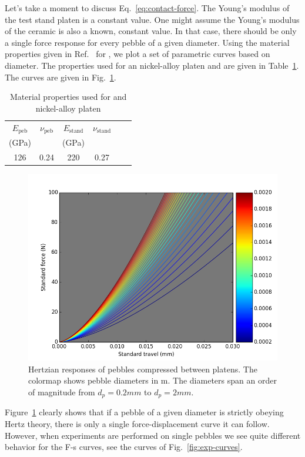 Let's take a moment to discuss Eq.~\ref{eq:contact-force}. The Young's modulus of the test stand platen is a constant value. One might assume the Young's modulus of the ceramic is also a known, constant value. In that case, there should be only a single force response for every pebble of a given diameter. Using the material properties given in Ref.~\cite{Gierszewski1998} for \lit, we plot a set of parametric curves based on diameter. The properties used for an nickel-alloy platen and \lit are given in Table~\ref{tab:hertz-dp-study-props}. The curves are given in Fig.~\ref{fig:hertz-dp-dependence}.

\begin {table}[htp] %
\caption{Material properties used for \lit and nickel-alloy platen}
\label {tab:hertz-dp-study-props} \centering %
\begin {tabular}{ cccccc }
\toprule %
$E_\text{peb}$		&     $\nu_\text{peb}$	&	$E_\text{stand}$		&     $\nu_\text{stand}$	\\
(GPa)			&					&	(GPa)				&					\\\toprule
126				&	0.24				&	220					& 	0.27				\\\bottomrule
\end{tabular}
\end{table}

\begin{figure}[ht!]
\centering
\includegraphics[width = 0.75 \textwidth]{chapters/figures/hertz-dp-dependence}
\caption{Hertzian responses of \lit pebbles compressed between platens. The colormap shows pebble diameters in \si{m}. The diameters span an order of magnitude from $d_p = \si{0.2 mm}$ to $d_p = \si{2 mm}$.}\label{fig:hertz-dp-dependence}
\end{figure}

Figure~\ref{fig:hertz-dp-dependence} clearly shows that if a pebble of a given diameter is strictly obeying Hertz theory, there is only a single force-displacement curve it can follow. However, when experiments are performed on single pebbles we see quite different behavior for the F-s curves, see the curves of Fig.~\ref{fig:exp-curves}. 


